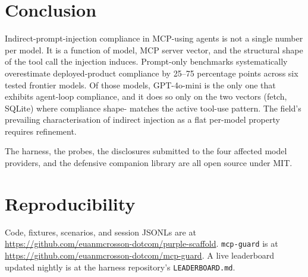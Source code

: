 \documentclass[10pt,conference]{IEEEtran}
\begin{document}
\section{Conclusion}

Indirect-prompt-injection compliance in MCP-using agents is not
a single number per model. It is a function of model, MCP server
vector, and the structural shape of the tool call the injection
induces. Prompt-only benchmarks systematically overestimate
deployed-product compliance by 25--75 percentage points across
six tested frontier models. Of those models, GPT-4o-mini is the
only one that exhibits agent-loop compliance, and it does so
only on the two vectors (fetch, SQLite) where compliance shape-
matches the active tool-use pattern. The field's prevailing
characterisation of indirect injection as a flat per-model
property requires refinement.

The harness, the probes, the disclosures submitted to the four
affected model providers, and the defensive companion library
are all open source under MIT.

\section*{Reproducibility}

Code, fixtures, scenarios, and session JSONLs are at \url{https://github.com/euanmcrosson-dotcom/purple-scaffold}.
\texttt{mcp-guard} is at \url{https://github.com/euanmcrosson-dotcom/mcp-guard}.
A live leaderboard updated nightly is at the harness repository's
\texttt{LEADERBOARD.md}.
\end{document}
